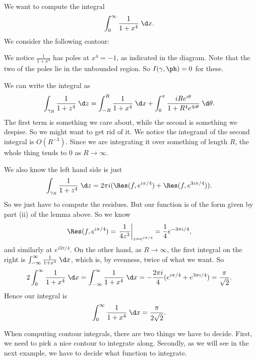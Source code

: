 \documentclass[a4paper]{article}
\begin{document}
\begin{eg}
  We want to compute the integral
  \[
    \int_0^{\infty} \frac{1}{1 + x^4}\;\d x.
  \]
  We consider the following contour:
  \begin{center}
  \end{center}
  We notice $\frac{1}{1 + x^4}$ has poles at $x^4 = -1$, as indicated in the diagram. Note that the two of the poles lie in the unbounded region. So $I(\gamma, \ph) = 0$ for these.

  We can write the integral as
  \[
    \int_{\gamma_R} \frac{1}{1 + z^4} \;\d z = \int_{-R}^R \frac{1}{1 + x^4} \;\d x + \int_0^\pi \frac{i Re^{i\theta}}{1 + R^4 e^{4 i \theta}}\;\d \theta.
  \]
  The first term is something we care about, while the second is something we despise. So we might want to get rid of it. We notice the integrand of the second integral is $O(R^{-3})$. Since we are integrating it over something of length $R$, the whole thing tends to $0$ as $R \to \infty$.

  We also know the left hand side is just
  \[
    \int_{\gamma_R} \frac{1}{1 + z^4} \;\d z = 2\pi i(\Res(f, e^{i \pi /4}) + \Res(f, e^{3i \pi /4})).
  \]
  So we just have to compute the residues. But our function is of the form given by part (ii) of the lemma above. So we know
  \[
    \Res(f, e^{i \pi /4}) = \left.\frac{1}{4z^3}\right|_{z = e^{i \pi /4}} = \frac{1}{4} e^{-3\pi i/4},
  \]
  and similarly at $e^{i 3\pi /4}$. On the other hand, as $R \to \infty$, the first integral on the right is $\int_{-\infty}^\infty \frac{1}{1 + x^4}\;\d x$, which is, by evenness, twice of what we want. So
  \[
    2\int_0^\infty \frac{1}{1 + x^4} \;\d x = \int_{-\infty}^\infty \frac{1}{1 + x^4}\;\d x = -\frac{2\pi i}{4} (e^{i \pi/4} + e^{3 \pi i/4}) = \frac{\pi}{\sqrt{2}}.
  \]
  Hence our integral is
  \[
    \int_0^\infty \frac{1}{1 + x^4}\;\d x = \frac{\pi}{2\sqrt{2}}.
  \]
\end{eg}
When computing contour integrals, there are two things we have to decide. First, we need to pick a nice contour to integrate along. Secondly, as we will see in the next example, we have to decide what function to integrate.
\end{document}
